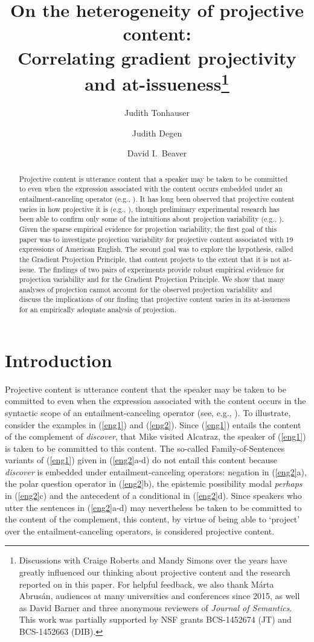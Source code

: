\documentclass[11pt,fleqn]{article}
\title{On the heterogeneity of projective content: \\ Correlating gradient projectivity and at-issueness\thanks{Discussions with Craige Roberts and Mandy Simons over the years have greatly influenced our thinking about projective content and the research reported on in this paper. For helpful feedback, we also thank M\'arta Abrus\'an, audiences at many universities and conferences since 2015, as well as David Barner and three anonymous reviewers of {\em Journal of Semantics}. This work was partially supported by NSF grants BCS-1452674 (JT) and BCS-1452663 (DIB).}}
\author[$\bullet$]{Judith Tonhauser}
\author[$\triangleright$]{Judith Degen}
\author[$\circ$]{David I.\ Beaver}
\affil[$\bullet$]{The Ohio State University}
\affil[$\triangleright$]{Stanford University}
\affil[$\circ$]{University of Texas at Austin}
\newcommand{\6}{\mbox{$[\hspace*{-.6mm}[$}}
\newcommand{\9}{\mbox{$]\hspace*{-.6mm}]$}}
\begin{document}
\maketitle

\begin{abstract}
Projective content is utterance content that a speaker may be taken to be committed to even when the expression associated with the content occurs embedded under an entailment-canceling operator (e.g., \citealt{ccmg90}). It has long been observed that projective content varies in how projective it is (e.g., \citealt{karttunen71b,simons01,abusch10}), though preliminary experimental research has been able to confirm only some of the intuitions about projection variability (e.g., \citealt{smith-hall11,xue-onea11}). Given the sparse empirical evidence for projection variability, the first goal of this paper was to investigate projection variability for projective content associated with 19 expressions of American English. The second goal was to explore the hypothesis, called the Gradient Projection Principle, that content projects to the extent that it is not at-issue. The findings of two pairs of experiments provide robust empirical evidence for projection variability and for the Gradient Projection Principle. We show that many analyses of projection  cannot account for the observed projection variability and discuss the implications of our finding that projective content varies in its at-issueness for an empirically adequate analysis of projection.

\end{abstract}


			
\section{Introduction}\label{s1}

Projective content is utterance content that the speaker may be taken to be committed to even when the expression associated with the content occurs in the syntactic scope of an entailment-canceling operator (see, e.g., \citealt{ccmg90}). To illustrate, consider the examples in (\ref{eng1}) and (\ref{eng2}). Since (\ref{eng1}) entails the content of the complement of {\em discover}, that Mike visited Alcatraz, the speaker of (\ref{eng1}) is taken to be committed to this content. The so-called Family-of-Sentences variants of (\ref{eng1}) given in (\ref{eng2}a-d) do not entail this content because {\em discover} is embedded under entailment-canceling operators: negation in (\ref{eng2}a), the polar question operator in (\ref{eng2}b), the epistemic possibility modal {\em perhaps} in (\ref{eng2}c) and the antecedent of a conditional in (\ref{eng2}d). Since speakers who utter the sentences in (\ref{eng2}a-d) may nevertheless be taken to be committed to the content of the complement, this content, by virtue of being able to `project' over the entailment-canceling operators, is considered projective content. 
\end{document}
